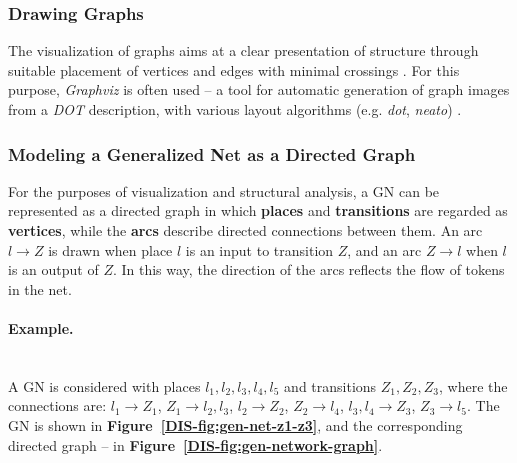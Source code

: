 \subsubsection{Drawing Graphs}

\hspace*{2.5em}The visualization of graphs aims at a clear presentation of structure through suitable placement of vertices and edges with minimal crossings \cite{DIS-Kamada1989}. For this purpose, \textit{Graphviz} is often used -- a tool for automatic generation of graph images from a \textit{DOT} description, with various layout algorithms (e.g. \textit{dot}, \textit{neato}) \cite{DIS-Ellson2004}.

\subsubsection{Modeling a Generalized Net as a Directed Graph}

\hspace*{2.5em}For the purposes of visualization and structural analysis, a GN can be represented as a directed graph in which \textbf{places} and \textbf{transitions} are regarded as \textbf{vertices}, while the \textbf{arcs} describe directed connections between them. An arc \(l \rightarrow Z\) is drawn when place \(l\) is an input to transition \(Z\), and an arc \(Z \rightarrow l\) when \(l\) is an output of \(Z\). In this way, the direction of the arcs reflects the flow of tokens in the net.

\paragraph{Example.}
\mbox{}\\
A GN is considered with places \(l_1, l_2, l_3, l_4, l_5\) and transitions \(Z_1, Z_2, Z_3\), where the connections are:
\(l_1 \rightarrow Z_1\), \(Z_1 \rightarrow l_2, l_3\), \(l_2 \rightarrow Z_2\), \(Z_2 \rightarrow l_4\), \(l_3, l_4 \rightarrow Z_3\), \(Z_3 \rightarrow l_5\).
The GN is shown in \textbf{Figure~\ref{DIS-fig:gen-net-z1-z3}}, and the corresponding directed graph -- in \textbf{Figure~\ref{DIS-fig:gen-network-graph}}.

